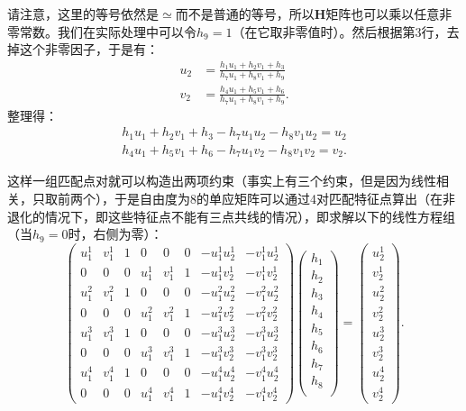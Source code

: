 请注意，这里的等号依然是$\simeq$而不是普通的等号，所以$\bm{H}$矩阵也可以乘以任意非零常数。我们在实际处理中可以令$h_9 = 1$（在它取非零值时）。然后根据第3行，去掉这个非零因子，于是有：
\[
\begin{aligned}
u_{2}&=\frac{h_{1}u_{1}+h_{2}v_{1}+h_{3}}{h_{7}u_{1}+h_{8}v_{1}+h_{9}}\\
v_{2}&=\frac{h_{4}u_{1}+h_{5}v_{1}+h_{6}}{h_{7}u_{1}+h_{8}v_{1}+h_{9}}.
\end{aligned}
\]
整理得：
\[
\begin{gathered}
h_{1}u_{1}+h_{2}v_{1}+h_{3}-h_{7}u_{1}u_{2}-h_{8}v_{1}u_{2}=u_{2}\\
h_{4}u_{1}+h_{5}v_{1}+h_{6}-h_{7}u_{1}v_{2}-h_{8}v_{1}v_{2}=v_{2}.
\end{gathered}
\]

这样一组匹配点对就可以构造出两项约束（事实上有三个约束，但是因为线性相关，只取前两个），于是自由度为8的单应矩阵可以通过4对匹配特征点算出（在非退化的情况下，即这些特征点不能有三点共线的情况），即求解以下的线性方程组（当$h_9 = 0$时，右侧为零）：
\begin{equation}
\begin{pmatrix}
u_{1}^{1}& v_{1}^{1}& 1 & 0 & 0 & 0 & -u_{1}^{1}u_{2}^{1} & -v_{1}^{1}u_{2}^{1}\\
0 & 0 & 0& u_{1}^{1}& v_{1}^{1}& 1 &  -u_{1}^{1}v_{2}^{1} & -v_{1}^{1}v_{2}^{1}\\
u_{1}^{2}& v_{1}^{2}& 1 & 0 & 0 & 0 & -u_{1}^{2}u_{2}^{2} & -v_{1}^{2}u_{2}^{2}\\
0 & 0 & 0& u_{1}^{2}& v_{1}^{2}& 1 &  -u_{1}^{2}v_{2}^{2} & -v_{1}^{2}v_{2}^{2}\\
u_{1}^{3}& v_{1}^{3}& 1 & 0 & 0 & 0 & -u_{1}^{3}u_{2}^{3} & -v_{1}^{3}u_{2}^{3}\\
0 & 0 & 0& u_{1}^{3}& v_{1}^{3}& 1 &  -u_{1}^{3}v_{2}^{3} & -v_{1}^{3}v_{2}^{3}\\
u_{1}^{4}& v_{1}^{4}& 1 & 0 & 0 & 0 & -u_{1}^{4}u_{2}^{4} & -v_{1}^{4}u_{2}^{4}\\
0 & 0 & 0& u_{1}^{4}& v_{1}^{4}& 1 &  -u_{1}^{4}v_{2}^{4} & -v_{1}^{4}v_{2}^{4}
\end{pmatrix}
\begin{pmatrix}
 h_{1}\\h_{2}\\h_{3}\\ h_{4}\\h_{5}\\h_{6}\\ h_{7}\\h_{8}\\  
\end{pmatrix}
=
\begin{pmatrix}
u_{2}^{1}\\ v_{2}^{1}\\ u_{2}^{2}\\ v_{2}^{2}\\u_{2}^{3}\\ v_{2}^{3}\\u_{2}^{4}\\ v_{2}^{4}
\end{pmatrix}.
\end{equation}

